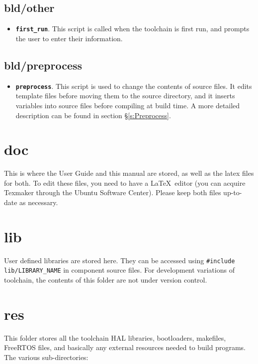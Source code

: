 \documentclass[a4paper, oneside, 11pt, titlepage, onecolumn, openright]{report}
\begin{document}
\subsection{bld/other}
			\label{ss:bld/other}
\begin{itemize}

\item \textbf{\texttt{first\_run}}. This script is called when the toolchain is first run, and prompts the user to enter their information.

\end{itemize}

\subsection{bld/preprocess}
			\label{ss:bld/preprocess}
\begin{itemize}

\item \textbf{\texttt{preprocess}}. This script is used to change the contents of source files. It edits template files before moving them to the source directory, and it inserts variables into source files before compiling at build time. A more detailed description can be found in section \S\ref{s:Preprocess}.

\end{itemize}

\section{doc}
			\label{s:doc}
			This is where the User Guide and this manual are stored, as well as the latex files for both. To edit these files, you need to have a \LaTeX\ editor (you can acquire Texmaker through the Ubuntu Software Center). Please keep both files up-to-date as necessary.
			
\section{lib}
			\label{s:lib}
			User defined libraries are stored here. They can be accessed using \texttt{\#include lib/LIBRARY\_NAME} in component source files. For development variations of toolchain, the contents of this folder are not under version control.
			
\section{res}
			\label{s:res}
			This folder stores all the toolchain HAL libraries, bootloaders, makefiles, FreeRTOS files, and basically any external resources needed to build programs. The various sub-directories:
			
\end{document}

